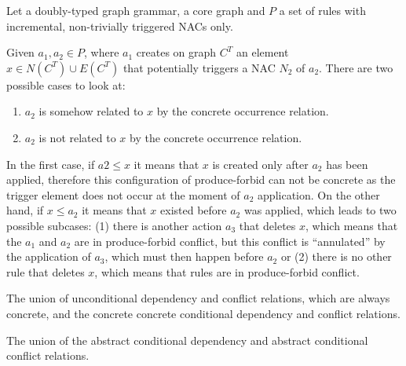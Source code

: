 \begin{definition} Let \doublyTypedGraphGrammarCore{} a doubly-typed graph grammar, \coreGraph{} a core graph and $P$ a set of rules with incremental, non-trivially triggered NACs only.

  Given $a_1,a_2 \in P$, where $a_1$ creates on graph $C^T$ an element $x \in N(C^T) \cup E(C^T)$ that potentially triggers a NAC $N_2$ of $a_2$. There are two possible cases to look at:

  \begin{enumerate}
    \item $a_2$ is somehow related to $x$ by the concrete occurrence relation.
    \item $a_2$ is not related to $x$ by the concrete occurrence relation.
  \end{enumerate}

  In the first case, if $a2 \leq x$ it means that $x$ is created only after $a_2$ has been applied, therefore this configuration of produce-forbid can not be concrete as the trigger element does not occur at the moment of $a_2$ application. On the other hand, if $x \leq a_2$ it means that $x$ existed before $a_2$ was applied, which leads to two possible subcases: (1) there is another action $a_3$ that deletes $x$, which means that the $a_1$ and $a_2$ are in produce-forbid conflict, but this
  conflict is ``annulated'' by the application of $a_3$, which must then happen before $a_2$ or (2) there is no other rule that deletes $x$, which means that rules are in
  produce-forbid conflict.
\end{definition}

\begin{definition} The union of unconditional dependency and conflict relations, which are always concrete, and the concrete concrete conditional dependency and conflict relations.
\end{definition}

\begin{definition} The union of the abstract conditional dependency and abstract conditional conflict relations.
\end{definition}

\begin{definition}
\end{definition}

\begin{definition}
\end{definition}

